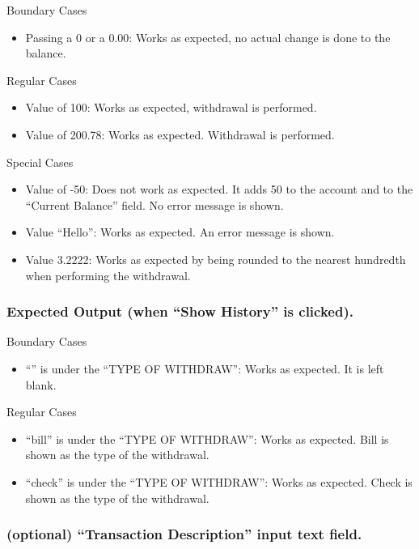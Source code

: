 \documentclass[12pt]{article}
\begin{document}
Boundary Cases
\begin{itemize}
  \item Passing a 0 or a 0.00: Works as expected, no actual change is done to the balance.
\end{itemize}

Regular Cases
\begin{itemize}
  \item Value of 100: Works as expected, withdrawal is performed.
  \item Value of 200.78: Works as expected. Withdrawal is performed.
\end{itemize}

Special Cases
\begin{itemize}
  \item Value of -50: Does not work as expected.  It adds 50 to the account and to the ``Current Balance'' field. No error message is shown.
  \item Value ``Hello'': Works as expected. An error message is shown.
  \item Value 3.2222: Works as expected by being rounded to the nearest hundredth when performing the withdrawal. 
\end{itemize}

\subsubsection{Expected Output (when ``Show History'' is clicked).}

Boundary Cases
\begin{itemize}
  \item ``'' is under the ``TYPE OF WITHDRAW'': Works as expected. It is left blank.
\end{itemize}

Regular Cases
\begin{itemize}
  \item ``bill'' is under the ``TYPE OF WITHDRAW'': Works as expected. Bill is shown as the type of the withdrawal.
  \item ``check'' is under the ``TYPE OF WITHDRAW'': Works as expected. Check is shown as the type of the withdrawal.
\end{itemize}

\subsubsection{(optional) ``Transaction Description'' input text field.}
\end{document}
